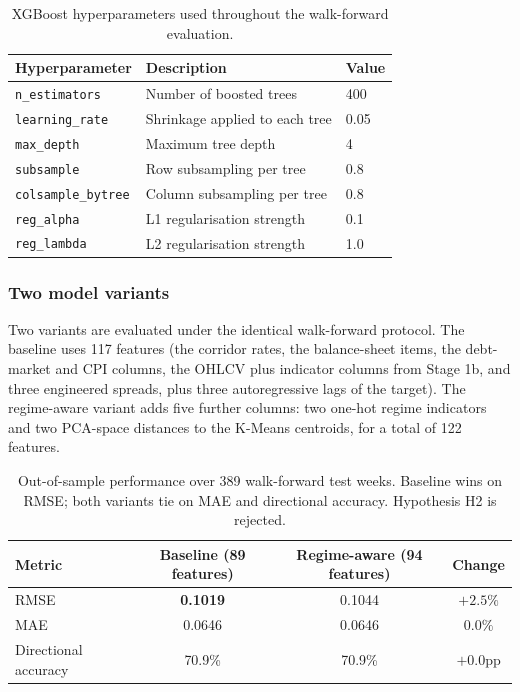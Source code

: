 \begin{table}[H]
\caption{XGBoost hyperparameters used throughout the walk-forward
evaluation.}
\renewcommand{\arraystretch}{1.18}
\begin{tabularx}{0.8\linewidth}{@{} l Y l @{}}
\toprule
{}\color{white}\textbf{Hyperparameter} &
\color{white}\textbf{Description} &
\color{white}\textbf{Value} \\
\midrule
\texttt{n\_estimators} & Number of boosted trees & 400 \\
\texttt{learning\_rate} & Shrinkage applied to each tree & 0.05 \\
\texttt{max\_depth} & Maximum tree depth & 4 \\
\texttt{subsample} & Row subsampling per tree & 0.8 \\
\texttt{colsample\_bytree} & Column subsampling per tree & 0.8 \\
\texttt{reg\_alpha} & L1 regularisation strength & 0.1 \\
\texttt{reg\_lambda} & L2 regularisation strength & 1.0 \\
\bottomrule
\end{tabularx}
\end{table}

\subsubsection{Two model variants}

Two variants are evaluated under the identical walk-forward protocol.
The baseline uses 117 features (the corridor rates, the balance-sheet
items, the debt-market and CPI columns, the OHLCV plus indicator
columns from Stage 1b, and three engineered spreads, plus three
autoregressive lags of the target). The regime-aware variant adds
five further columns: two one-hot regime indicators and two
PCA-space distances to the K-Means centroids, for a total of 122
features.

\begin{table}[H]
\caption{Out-of-sample performance over 389 walk-forward test weeks.
Baseline wins on RMSE; both variants tie on MAE and directional
accuracy. Hypothesis H2 is rejected.}
\label{tab:perf}
\renewcommand{\arraystretch}{1.2}
\begin{tabularx}{\linewidth}{@{} Y c c c @{}}
\toprule
{}\color{white}\textbf{Metric} &
\color{white}\textbf{Baseline (89 features)} &
\color{white}\textbf{Regime-aware (94 features)} &
\color{white}\textbf{Change} \\
\midrule
RMSE & \textbf{0.1019} & 0.1044 & $+2.5\%$ \\
MAE & 0.0646 & 0.0646 & $0.0\%$ \\
Directional accuracy & 70.9\% & 70.9\% & $+0.0$pp \\
\bottomrule
\end{tabularx}
\end{table}

